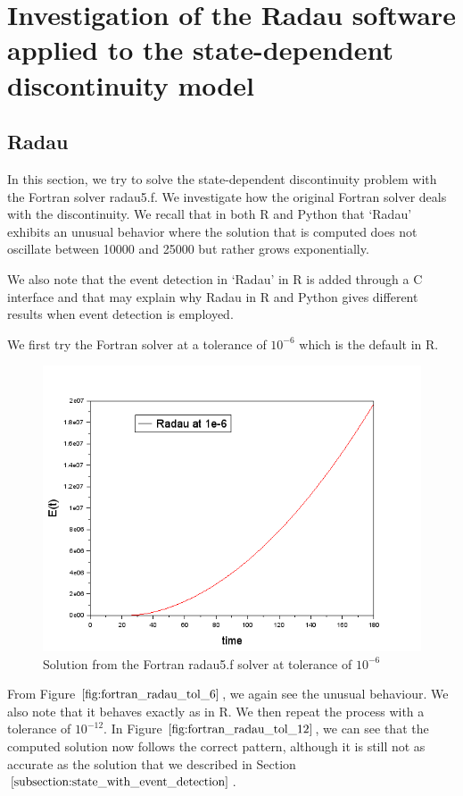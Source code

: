 
\section{Investigation of the Radau software applied to the state-dependent discontinuity model}
\label{section:fortran_inaccuracies}
\subsection{Radau}
In this section, we try to solve the state-dependent discontinuity problem with the Fortran solver radau5.f. We investigate how the original Fortran solver deals with the discontinuity. We recall that in both R and Python that `Radau' exhibits an unusual behavior where the solution that is computed does not oscillate between 10000 and 25000 but rather grows exponentially. 

We also note that the event detection in `Radau' in R is added through a C interface and that may explain why Radau in R and Python gives different results when event detection is employed.

We first try the Fortran solver at a tolerance of $10^{-6}$ which is the default in R.
\begin{figure}[h]
\centering
\includegraphics[width=0.7\linewidth]{./figures/fortran_radau_tol_6}
\caption{Solution from the Fortran radau5.f solver at tolerance of $10^{-6}$}
\label{fig:fortran_radau_tol_6}
\end{figure}

From Figure $\ref{fig:fortran_radau_tol_6}$, we again see the unusual behaviour. We also note that it behaves exactly as in R. We then repeat the process with a tolerance of $10^{-12}$. In Figure $\ref{fig:fortran_radau_tol_12}$, we can see that the computed solution now follows the correct pattern, although it is still not as accurate as the solution that we described in Section $\ref{subsection:state_with_event_detection}$.

